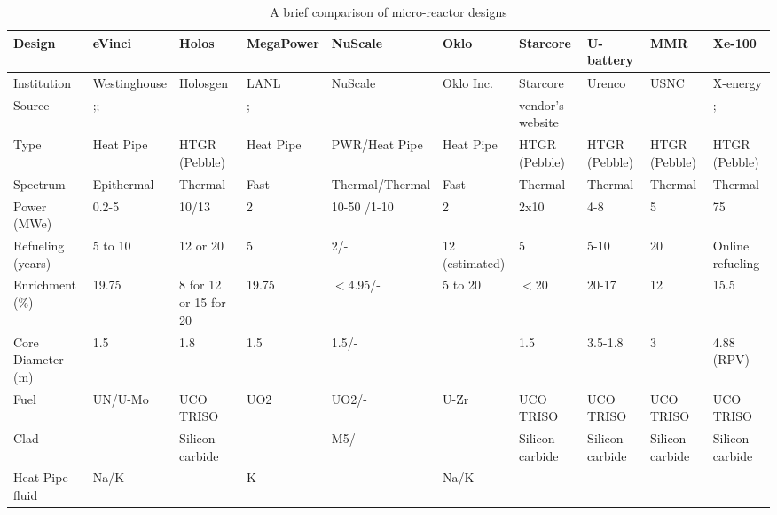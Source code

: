 \documentclass[10pt,a4paper]{article}
\begin{document}
\pagebreak
{}
\begin{landscape}
\begin{table} [ht]
\begin{center}

\caption{A brief comparison of micro-reactor designs}
\label{microreactors}
\begin{tabular}{|l|l|l|l|l|l|l|l|l|l|}
\hline 
Design 		&eVinci 		& Holos		&MegaPower 	& NuScale		& Oklo 		& Starcore		& U-battery 	& MMR 	& Xe-100 \\ 
\hline 
Institution 	&Westinghouse& Holosgen	&LANL	& NuScale		& Oklo Inc. 	& Starcore		& Urenco 	& USNC	& X-energy \\ 
Source 	&\cite{levinsky_westinghouse_2018};\cite{yan_technology_2020};\cite{arafat_evinci_2019}  &\cite{filippone_holos_2017}  	& \cite{mcclure_design_2015};\cite{sterbentz_special_2017}	& \cite{nuscale_chapter_2018} 		& \cite{oklo_inc._pilot_2018} 	&vendor's website		&\cite{ding_design_2011}  	&\cite{venneri_neutronic_2015} 	&\cite{iaea_advances_2018}; \cite{harlan_x-energy_2018} \\ 
Type			&Heat Pipe	& HTGR (Pebble)	  	& Heat Pipe 		& PWR/Heat Pipe&Heat Pipe   			&	HTGR (Pebble)			& HTGR (Pebble)	& HTGR (Pebble) & HTGR (Pebble)\\ 
Spectrum		&Epithermal	& Thermal 		 	&Fast  	&Thermal/Thermal 		&Fast   			& Thermal  			&	Thermal		&Thermal &Thermal\\ 
Power (MWe)	&0.2-5		& 10/13  			&2			& 10-50 /1-10			& 2  			&2x10  			&4-8		&5	&75\\ 
Refueling (years)&5 to 10		&12 or 20   			&	5		& 2/- 			& 12 (estimated)  			&5  			&5-10 	&20		&Online refueling\\ 
Enrichment (\%)&19.75		&8 for 12 or 15 for 20   			&19.75			& $<$4.95/- 		&  5 to 20 			&$<$20	  			&20-17	&12		&15.5\\ 
Core  Diameter (m)	&1.5		& 1.8  			&1.5			& 1.5/- 		&   			&1.5   			&3.5-1.8		& 3 	& 4.88 (RPV)\\ 
Fuel			&UN/U-Mo	& UCO TRISO  			&	UO2		&UO2/-		&  U-Zr 			& UCO TRISO  			&UCO TRISO	&UCO TRISO	&UCO TRISO\\ 
Clad			&-		&  Silicon carbide 			&	-		& M5/- 		&   -			&Silicon carbide   			&Silicon carbide		&Silicon carbide 	&Silicon carbide\\ 
Heat Pipe fluid	&Na/K	& -  			&K			& - 		& Na/K 			&  - 	&	-			&	-		&-\\ 
\hline
\end{tabular}


\end{center}
\end{table}
\end{landscape}
\end{document}
